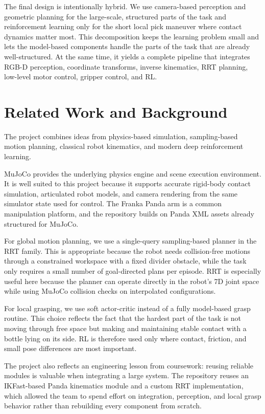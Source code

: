 \documentclass[11pt]{article}
\begin{document}
The final design is intentionally hybrid. We use camera-based perception and geometric planning for the large-scale, structured parts of the task and reinforcement learning only for the short local pick maneuver where contact dynamics matter most. This decomposition keeps the learning problem small and lets the model-based components handle the parts of the task that are already well-structured. At the same time, it yields a complete pipeline that integrates RGB-D perception, coordinate transforms, inverse kinematics, RRT planning, low-level motor control, gripper control, and RL.

\section{Related Work and Background}

The project combines ideas from physics-based simulation, sampling-based motion planning, classical robot kinematics, and modern deep reinforcement learning.

MuJoCo provides the underlying physics engine and scene execution environment. It is well suited to this project because it supports accurate rigid-body contact simulation, articulated robot models, and camera rendering from the same simulator state used for control. The Franka Panda arm is a common manipulation platform, and the repository builds on Panda XML assets already structured for MuJoCo.

For global motion planning, we use a single-query sampling-based planner in the RRT family. This is appropriate because the robot needs collision-free motions through a constrained workspace with a fixed divider obstacle, while the task only requires a small number of goal-directed plans per episode. RRT is especially useful here because the planner can operate directly in the robot's 7D joint space while using MuJoCo collision checks on interpolated configurations.

For local grasping, we use soft actor-critic instead of a fully model-based grasp routine. This choice reflects the fact that the hardest part of the task is not moving through free space but making and maintaining stable contact with a bottle lying on its side. RL is therefore used only where contact, friction, and small pose differences are most important.

The project also reflects an engineering lesson from coursework: reusing reliable modules is valuable when integrating a large system. The repository reuses an IKFast-based Panda kinematics module and a custom RRT implementation, which allowed the team to spend effort on integration, perception, and local grasp behavior rather than rebuilding every component from scratch.
\end{document}
